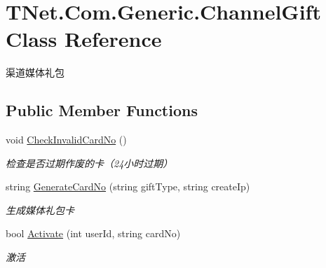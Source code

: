 \hypertarget{class_t_net_1_1_com_1_1_generic_1_1_channel_gift}{}\section{T\+Net.\+Com.\+Generic.\+Channel\+Gift Class Reference}
\label{class_t_net_1_1_com_1_1_generic_1_1_channel_gift}


渠道媒体礼包  


\subsection*{Public Member Functions}
\begin{DoxyCompactItemize}
\item 
void \mbox{\hyperlink{class_t_net_1_1_com_1_1_generic_1_1_channel_gift_ac3a97bf29a95ed15916523136df18ddf}{Check\+Invalid\+Card\+No}} ()
\begin{DoxyCompactList}\small\item\em 检查是否过期作废的卡（24小时过期） \end{DoxyCompactList}\item 
string \mbox{\hyperlink{class_t_net_1_1_com_1_1_generic_1_1_channel_gift_aa712701fe3894974f4717f67d46b6cec}{Generate\+Card\+No}} (string gift\+Type, string create\+Ip)
\begin{DoxyCompactList}\small\item\em 生成媒体礼包卡 \end{DoxyCompactList}\item 
bool \mbox{\hyperlink{class_t_net_1_1_com_1_1_generic_1_1_channel_gift_a6d0dcd4d38cb6f36256cd8268c83f3ba}{Activate}} (int user\+Id, string card\+No)
\begin{DoxyCompactList}\small\item\em 激活 \end{DoxyCompactList}\end{DoxyCompactItemize}
